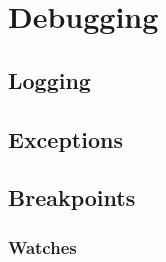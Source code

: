 \chapter{Debugging}

\section{Logging}

\section{Exceptions}

\section{Breakpoints}

\subsection{Watches}
